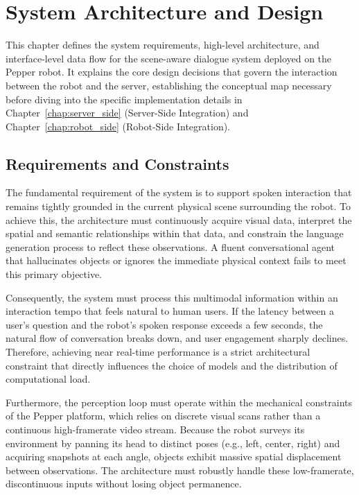 \chapter{System Architecture and Design}\label{chap:system_architecture}

This chapter defines the system requirements, high-level architecture, and interface-level data flow for the scene-aware dialogue system deployed on the Pepper robot. It explains the core design decisions that govern the interaction between the robot and the server, establishing the conceptual map necessary before diving into the specific implementation details in Chapter~\ref{chap:server_side} (Server-Side Integration) and Chapter~\ref{chap:robot_side} (Robot-Side Integration).

\section{Requirements and Constraints}\label{sec:requirements_constraints}

The fundamental requirement of the system is to support spoken interaction that remains tightly grounded in the current physical scene surrounding the robot. To achieve this, the architecture must continuously acquire visual data, interpret the spatial and semantic relationships within that data, and constrain the language generation process to reflect these observations. A fluent conversational agent that hallucinates objects or ignores the immediate physical context fails to meet this primary objective.

Consequently, the system must process this multimodal information within an interaction tempo that feels natural to human users. If the latency between a user's question and the robot's spoken response exceeds a few seconds, the natural flow of conversation breaks down, and user engagement sharply declines. Therefore, achieving near real-time performance is a strict architectural constraint that directly influences the choice of models and the distribution of computational load.

Furthermore, the perception loop must operate within the mechanical constraints of the Pepper platform, which relies on discrete visual scans rather than a continuous high-framerate video stream. Because the robot surveys its environment by panning its head to distinct poses (e.g., left, center, right) and acquiring snapshots at each angle, objects exhibit massive spatial displacement between observations. The architecture must robustly handle these low-framerate, discontinuous inputs without losing object permanence.

